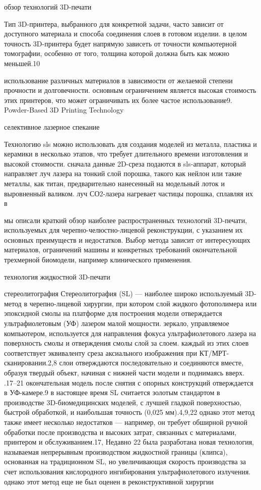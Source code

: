 обзор технологий 3D-печати                                                               

Тип 3D-принтера, выбранного для конкретной задачи, часто зависит от доступного
материала и способа соединения слоев в готовом изделии. в целом точность
3D-принтера будет напрямую зависеть от точности компьютерной томографии,
особенно от того, толщина которой должна быть как можно меньшей.10

использование различных материалов в зависимости от желаемой степени прочности и
долговечности. основным ограничением является высокая стоимость этих принтеров,
что может ограничивать их более частое использование9.
Powder-Based 3D Printing Technology

селективное лазерное спекание

Технологию sls можно использовать для создания моделей из металла, пластика и
керамики в несколько этапов, что требует длительного времени изготовления и
высокой стоимости. сначала данные 2D-среза подаются в sls-аппарат, который
направляет луч лазера на тонкий слой порошка, такого как нейлон или такие
металлы, как титан, предварительно нанесенный на модельный лоток и выровненный
валиком. луч СО2-лазера нагревает частицы порошка, сплавляя их в

мы описали краткий обзор наиболее распространенных технологий 3D-печати,
используемых для черепно-челюстно-лицевой реконструкции, с указанием их основных
преимуществ и недостатков. Выбор метода зависит от интересующих материалов,
ограничений машины и конкретных требований окончательной трехмерной биомодели,
например клинического применения.

технология жидкостной 3D-печати
                                                                
стереолитография                                               
Стереолитография (SL) — наиболее широко используемый 3D-метод в черепно-лицевой
хирургии, при котором слой жидкого фотополимера или эпоксидной смолы на
платформе для построения модели отверждается ультрафиолетовым (УФ) лазером малой
мощности. зеркало, управляемое компьютером, используется для направления фокуса
ультрафиолетового лазера на поверхность смолы и отверждения смолы слой за слоем.
каждый из этих слоев соответствует эквиваленту среза аксиального изображения при
КТ/МРТ-сканировании.2,8 слои отверждаются последовательно и соединяются вместе,
образуя твердый объект, начиная с нижней части модели и поднимаясь вверх. .17–21
окончательная модель после снятия с опорных конструкций отверждается в
УФ-камере.9 в настоящее время SL считается золотым стандартом в производстве
3D-биомедицинских моделей, с лучшей гладкой поверхностью, быстрой обработкой, и
наибольшая точность (0,025 мм).4,9,22 однако этот метод также имеет несколько
недостатков — например, он требует обширной ручной обработки после производства
и высоких затрат, связанных с материалами, принтером и обслуживанием.17, Недавно
22 была разработана новая технология, называемая непрерывным производством
жидкостной границы (клипса), основанная на традиционном SL, но увеличивающая
скорость производства за счет использования кислородного ингибирования
ультрафиолетового излучения. однако этот метод еще не был оценен в
реконструктивной хирургии

